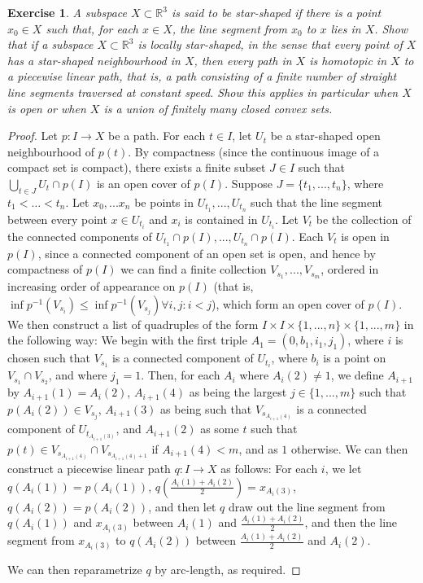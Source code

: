 \documentclass{article}
\newtheorem{exercise}[theorem]{Exercise}
\begin{document}
\begin{exercise}
A subspace $X\subset\mathbb{R}^3$ is said to be star-shaped if there is a point $x_0\in X$ such that, for each $x\in X$, the line segment from $x_0$ to $x$ lies in $X$. Show that if a subspace $X\subset\mathbb{R}^3$ is locally star-shaped, in the sense that every point of $X$ has a star-shaped neighbourhood in $X$, then every path in $X$ is homotopic in $X$ to a piecewise linear path, that is, a path consisting of a finite number of straight line segments traversed at constant speed. Show this applies in particular when $X$ is open or when $X$ is a union of finitely many closed convex sets.
\end{exercise}
\begin{proof}
Let $p:I\to X$ be a path. For each $t\in I$, let $U_t$ be a star-shaped open neighbourhood of $p(t)$. By compactness (since the continuous image of a compact set is compact), there exists a finite subset $J\in I$ such that $\bigcup_{t\in J}U_t\cap p(I)$ is an open cover of $p(I)$. Suppose $J=\{t_1,...,t_n\}$, where $t_1<\dots<t_n$. Let $x_0,...x_n$ be points in $U_{t_1},...,U_{t_n}$ such that the line segment between every point $x\in U_{t_i}$ and $x_i$ is contained in $U_{t_i}$. Let $V_t$ be the collection of the connected components of $U_{t_1}\cap p(I),...,U_{t_n}\cap p(I)$. Each $V_t$ is open in $p(I)$, since a connected component of an open set is open, and hence by compactness of $p(I)$ we can find a finite collection $V_{s_1},...,V_{s_m}$, ordered in increasing order of appearance on $p(I)$ (that is, $\inf p^{-1}(V_{s_i})\leq\inf p^{-1}(V_{s_j})\forall i,j:i<j$), which form an open cover of $p(I)$. We then construct a list of quadruples of the form $I\times I\times \{1,...,n\}\times\{1,...,m\}$ in the following way: We begin with the first triple $A_1=(0,b_1,i_1,j_1)$, where $i$ is chosen such that $V_{s_1}$ is a connected component of $U_{t_i}$, where $b_i$ is a point on $V_{s_1}\cap V_{s_2}$, and where $j_1=1$. Then, for each $A_{i}$ where $A_i(2)\neq 1$, we define $A_{i+1}$ by $A_{i+1}(1)=A_i(2)$, $A_{i+1}(4)$ as being the largest $j\in\{1,...,m\}$ such that $p(A_i(2))\in V_{s_j}$, $A_{i+1}(3)$ as being such that $V_{s_{A_{i+1}(4)}}$ is a connected component of $U_{t_{A_{i+1}(3)}}$, and $A_{i+1}(2)$ as some $t$ such that $p(t)\in V_{s_{A_{i+1}(4)}}\cap V_{s_{A_{i+1}(4)+1}}$ if $A_{i+1}(4)<m$, and as $1$ otherwise. We can then construct a piecewise linear path $q:I\to X$ as follows: For each $i$, we let $q(A_i(1))=p(A_i(1))$, $q\left(\frac{A_i(1)+A_i(2)}{2}\right)=x_{A_i(3)}$, $q(A_i(2))=p(A_i(2))$, and then let $q$ draw out the line segment from $q(A_i(1))$ and $x_{A_i(3)}$ between $A_i(1)$ and $\frac{A_i(1)+A_i(2)}{2}$, and then the line segment from $x_{A_i(3)}$ to $q(A_i(2))$ between $\frac{A_i(1)+A_i(2)}{2}$ and $A_i(2)$.

We can then reparametrize $q$ by arc-length, as required.
\end{proof}
\end{document}
